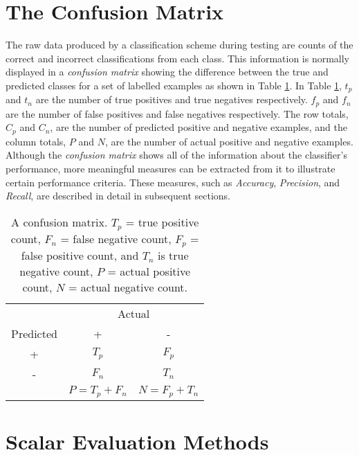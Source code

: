 \documentclass[10pt]{unbthesis}
\begin{document}
\section{The Confusion Matrix}
The raw data produced by a classification scheme during testing are
counts of the correct and incorrect classifications from each
class. This information is normally displayed in a \textit{confusion
  matrix} showing the difference between the true and predicted
classes for a set of labelled examples as shown in Table
\ref{tab:confusionmatrix}. In Table \ref{tab:confusionmatrix}, \(t_p\)
and \(t_n\) are the number of true positives and true negatives
respectively. \(f_p\) and \(f_n\) are the number of false positives
and false negatives respectively. The row totals, \(C_p\) and \(C_n\),
are the number of predicted positive and negative examples, and the
column totals, \(P\) and \(N\), are the number of actual positive
and negative examples. Although the \textit{confusion matrix} shows
all of the information about the classifier's performance, more
meaningful measures can be extracted from it to illustrate certain
performance criteria. These measures, such as \textit{Accuracy},
\textit{Precision}, and \textit{Recall}, are described in detail in
subsequent sections.

\begin{table}
\centering
  \begin{tabular}{c|c|c|}
    & \multicolumn{2}{|c|}{Actual} \\ \cline{1-3}
 Predicted & +                   & -                  \\ \hline
    +      & \(T_p\)             & \(F_p\)             \\ \hline
    -      & \(F_n\)             & \(T_n\)             \\ \hline
           & \(P = T_p + F_n\)   & \(N = F_p + T_n\)    \\ \cline{2-3}
  \end{tabular}
  \caption{A confusion matrix. \(T_p\) = true positive count, \(F_n\)
  = false negative count, \(F_p\) = false positive count, and \(T_n\)
  is true negative count, \(P\) = actual positive count, \(N\) = actual
  negative count.}
  \label{tab:confusionmatrix}
\end{table}


\section{Scalar Evaluation Methods}
\end{document}
